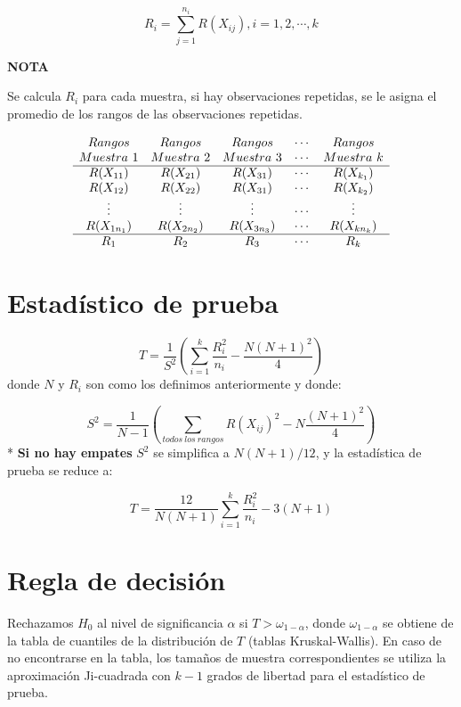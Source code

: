 \documentclass[
  a4paper,
  oneside,
  openany]{book}
\begin{document}
\[R_{i}=\sum_{j=1}^{n_{i}} R(X_{ij}),  i= 1, 2,\cdots,k\]

\textbf{NOTA}

Se calcula \(R_{i}\) para cada muestra, si hay observaciones repetidas, se le asigna el promedio de los rangos de las observaciones repetidas.

\[
\begin{array}{c c c c c} 
Rangos & Rangos & Rangos & \cdots  & Rangos \\
Muestra\ 1 & Muestra \ 2 & Muestra\ 3 & \cdots & Muestra\ k \\
\hline
R(X_{11}) &  R(X_{21}) & R(X_{31})  & \cdots & R(X_{k_{1}}) \\ 
R(X_{12}) &  R(X_{22}) & R(X_{31}) & \cdots & R(X_{k_{2}}) \\  
\vdots &  \vdots & \vdots  & \cdots &\vdots \\ 
R(X_{1n_{1}}) &R(X_{2n_{2}})   &R(X_{3n_{3}})   & \cdots &  R(X_{kn_{k}}) \\ 
\hline
R_{1} & R_{2} & R_{3} & \cdots&R_{k} \\
\end{array}
\]

\hypertarget{estaduxedstico-de-prueba-6}{%
\section{Estadístico de prueba}\label{estaduxedstico-de-prueba-6}}

\[T= \frac{1}{S^2}\left(\sum_{i=1}^{k}\frac{R^2_{i}}{n_{i}}-\frac{N(N+1)^2}{4}\right)\]
donde \(N\) y \(R_{i}\) son como los definimos anteriormente y donde:

\[ S^2 = \frac{1}{N-1}\left(\sum_{todos\ los\ rangos}R(X_{ij})^2-N\frac{(N+1)^2}{4}\right)\]
* \textbf{Si no hay empates} \(S^2\) se simplifica a \(N(N+1)/12\), y la estadística de prueba se reduce a:

\[ T= \frac{12}{N(N+1)}\sum_{i=1}^{k}\frac{R^2_{i}}{n_{i}}-3(N+1) \]

\hypertarget{regla-de-decisiuxf3n-16}{%
\section{Regla de decisión}\label{regla-de-decisiuxf3n-16}}

Rechazamos \(H_0\) al nivel de significancia \(\alpha\) si \(T>\omega_{1-\alpha}\), donde \(\omega_{1-\alpha}\) se obtiene de la tabla de cuantiles de la distribución de \(T\) (tablas Kruskal-Wallis). En caso de no encontrarse en la tabla, los tamaños de muestra correspondientes se utiliza la aproximación Ji-cuadrada con \(k-1\) grados de libertad para el estadístico de prueba.
\end{document}
